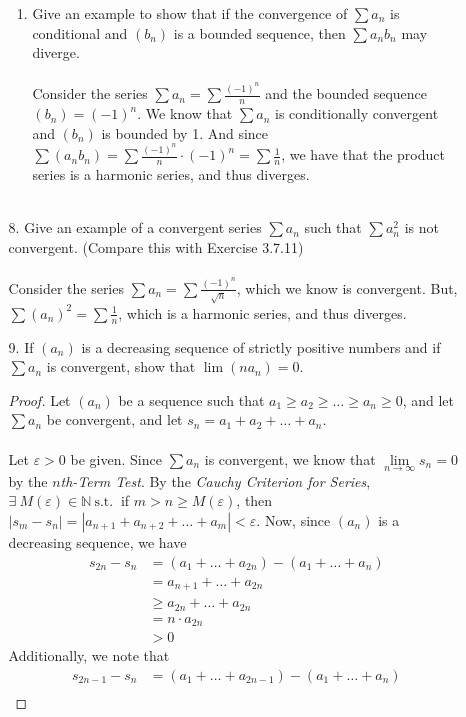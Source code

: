\documentclass[12pt,letterpaper]{article}
\newcommand{\limx}[2]{\displaystyle\lim\limits_{#1 \to #2}}
\newcommand{\st}{\ \text{s.t.}\ }
\newcommand{\N}{\mathbb{N}}
\theoremstyle{case}
\theoremstyle{definition}
\begin{document}
\begin{enumerate}
\begin{enumerate}
\begin{enumerate}
				\item Give an example to show that if the convergence of $\sum a_n$ is conditional and $(b_n)$ is a bounded sequence, then $\sum a_nb_n$ may diverge.
				\\\\Consider the series $\sum a_n=\sum\displaystyle\frac{(-1)^n}{n}$ and the bounded sequence  $(b_n)=(-1)^n$. We know that $\sum a_n$ is conditionally convergent and $(b_n)$ is bounded by 1. And since $\sum (a_nb_n) = \sum \displaystyle\frac{(-1)^n}{n}\cdot(-1)^n=\sum \frac{1}{n}$, we have that the product series is a harmonic series, and thus diverges.\\\
			\end{enumerate}
			\item[8.] Give an example of a convergent series $\sum a_n$ such that $\sum a^2_n$ is not convergent. (Compare this with Exercise 3.7.11)
			\\\\Consider the series $\sum a_n=\sum \displaystyle\frac{(-1)^n}{\sqrt{n}}$, which we know is convergent. But, $\sum (a_n)^2 = \sum \frac{1}{n}$, which is a harmonic series, and thus diverges.\\
			\item[9.] If $(a_n)$ is a decreasing sequence of strictly positive numbers and if $\sum a_n$ is convergent, show that $\lim (na_n)=0$.
			\begin{proof}
				Let $(a_n)$ be a sequence such that $a_1 \geq a_2 \geq \dots \geq a_n \geq 0$, and let $\sum a_n$ be convergent, and let $s_n=a_1+a_2+\dots+a_n$.
				\\\\Let $\varepsilon>0$ be given. Since $\sum a_n$ is convergent, we know that $\limx{n}{\infty} s_n=0$ by the \textit{$n$th-Term Test}. By the \textit{Cauchy Criterion for Series}, $\exists\ M(\varepsilon) \in \N \st$ if $m > n \geq M(\varepsilon)$, then $|s_m-s_n| = |a_{n+1}+a_{n+2}+\dots+a_m|<\varepsilon$. Now, since $(a_n)$ is a decreasing sequence, we have
				\begin{align*}
					s_{2n}-s_n &= (a_1+\dots+a_{2n}) - (a_1+\dots+a_n) \\
					&= a_{n+1}+\dots + a_{2n} \\
					&\geq a_{2n}+\dots+a_{2n} \\
					&= n \cdot a_{2n}\\
					&> 0
				\end{align*}
				Additionally, we note that
				\begin{align*}
					s_{2n-1}-s_n &= (a_1+\dots +a_{2n-1}) -(a_1+\dots+a_n) \\

\end{align*}
\end{proof}
\end{enumerate}
\end{enumerate}
\end{document}
